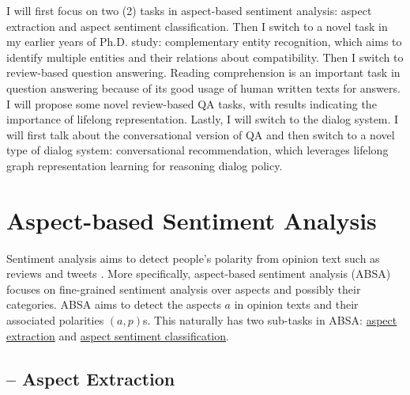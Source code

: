 I will first focus on two (2) tasks in aspect-based sentiment analysis: aspect extraction and aspect sentiment classification.
Then I switch to a novel task in my earlier years of Ph.D. study: complementary entity recognition, which aims to identify multiple entities and their relations about compatibility.
Then I switch to review-based question answering. Reading comprehension is an important task in question answering because of its good usage of human written texts for answers. I will propose some novel review-based QA tasks, with results indicating the importance of lifelong representation.
Lastly, I will switch to the dialog system.
I will first talk about the conversational version of QA and then switch to a novel type of dialog system: conversational recommendation, which leverages lifelong graph representation learning for reasoning dialog policy.

\section{Aspect-based Sentiment Analysis}
\label{chap6:sec:sa}

Sentiment analysis aims to detect people's polarity from opinion text such as reviews and tweets \cite{Liu2012}.
More specifically, aspect-based sentiment analysis (ABSA) focuses on fine-grained sentiment analysis over aspects and possibly their categories.
ABSA aims to detect the aspects $a$ in opinion texts and their associated polarities $(a, p)$s.
This naturally has two sub-tasks in ABSA: \underline{aspect extraction} and \underline{aspect sentiment classification}.

\subsection{-- Aspect Extraction}


